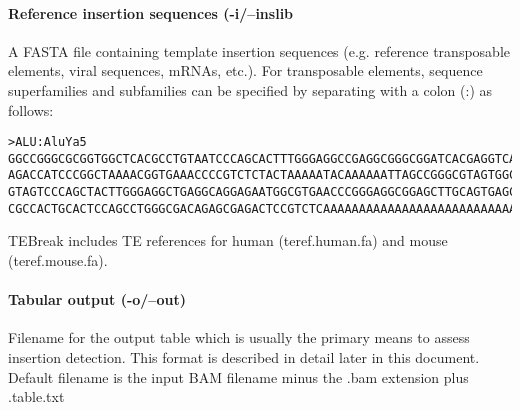 \documentclass[letterpaper,11pt]{article}
\begin{document}
\paragraph{Reference insertion sequences (-i/--inslib}
A FASTA file containing template insertion sequences (e.g. reference transposable elements, viral sequences, mRNAs, etc.). For transposable elements, sequence superfamilies and subfamilies can be specified by separating with a colon (:) as follows:

\begin{verbatim}
>ALU:AluYa5
GGCCGGGCGCGGTGGCTCACGCCTGTAATCCCAGCACTTTGGGAGGCCGAGGCGGGCGGATCACGAGGTCAGGAGATCG
AGACCATCCCGGCTAAAACGGTGAAACCCCGTCTCTACTAAAAATACAAAAAATTAGCCGGGCGTAGTGGCGGGCGCCT
GTAGTCCCAGCTACTTGGGAGGCTGAGGCAGGAGAATGGCGTGAACCCGGGAGGCGGAGCTTGCAGTGAGCCGAGATCC
CGCCACTGCACTCCAGCCTGGGCGACAGAGCGAGACTCCGTCTCAAAAAAAAAAAAAAAAAAAAAAAAAAAAAAAAAAA
\end{verbatim}

TEBreak includes TE references for human (teref.human.fa) and mouse (teref.mouse.fa).

\paragraph{Tabular output (-o/--out)}
Filename for the output table which is usually the primary means to assess insertion detection. This format is described in detail later in this document. Default filename is the input BAM filename minus the .bam extension plus .table.txt
\end{document}
